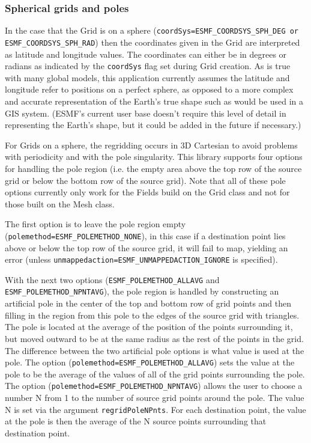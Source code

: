 \subsubsection{Spherical grids and poles}
In the case that the Grid is on a sphere ({\tt coordSys=ESMF\_COORDSYS\_SPH\_DEG or ESMF\_COORDSYS\_SPH\_RAD})
then the coordinates given in the Grid are interpreted as latitude and longitude values. The coordinates can either be in degrees or radians as indicated by the 
{\tt coordSys} flag set during Grid creation. As is true with many global models, this application currently assumes the latitude and longitude refer to positions on a 
perfect sphere, as opposed to a more complex and accurate representation of the Earth's true shape such as would be used in a GIS system. (ESMF's current user base doesn't 
require this level of detail in representing the Earth's shape, but it could be added in the future if necessary.)

For Grids on a sphere, the regridding occurs in 3D Cartesian to avoid
problems with periodicity and with the pole singularity. This library
 supports four options for handling the pole region (i.e. the empty area above the top row of the source grid or below
 the bottom row of the source grid).  Note that all of these pole options currently only work for the Fields build on the Grid class and not for those built on 
 the Mesh class. 

 The first option is to leave the pole region empty ({\tt polemethod=ESMF\_POLEMETHOD\_NONE}), in this 
 case if a destination point lies above or below the 
 top row of the source grid, it will fail to map, yielding an error (unless {\tt unmappedaction=ESMF\_UNMAPPEDACTION\_IGNORE} is specified).  

 With the next two options ({\tt ESMF\_POLEMETHOD\_ALLAVG} and {\tt ESMF\_POLEMETHOD\_NPNTAVG}), the pole region is handled by constructing 
 an artificial pole in the center of the top and bottom row of grid points and then filling
 in the region from this pole to the edges of the source grid with triangles. 
 The pole is located at the average of the position of the points surrounding
 it, but moved outward to be at the same radius as the rest of the points
 in the grid. The difference between the two artificial pole options is what value is used at the pole. 
 The option ({\tt polemethod=ESMF\_POLEMETHOD\_ALLAVG}) sets the value at the pole to be the average of the values
 of all of the grid points surrounding the pole. The option ({\tt polemethod=ESMF\_POLEMETHOD\_NPNTAVG}) allows the user to choose
 a number N from 1 to the number of source grid points around the pole. The value N is set via the argument {\tt regridPoleNPnts}. For
 each destination point, the value at the pole is then the average of the N source points
 surrounding that destination point. 

